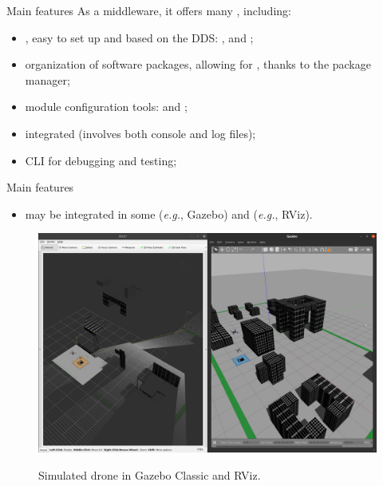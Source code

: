 \begin{frame}{Main features}
	As a middleware, it offers many , including:
	\begin{itemize}
		\item {}, easy to set up and based on the DDS: ,  and ;
		\item organization of software packages, allowing for , thanks to the  package manager;
		\item module configuration tools:  and ;
		\item integrated  (involves both console and log files);
		\item CLI  for debugging and testing;
	\end{itemize}
\end{frame}
\begin{frame}{Main features}
	\begin{itemize}
		\item may be integrated in some  (\emph{e.g.}, Gazebo) and  (\emph{e.g.}, RViz).
	\end{itemize}
	\begin{figure}
		\centering
		\includegraphics[scale=.133]{simulation.png}
		\label{fig:sim}
		\caption{Simulated drone in Gazebo Classic and RViz.}
	\end{figure}
\end{frame}

